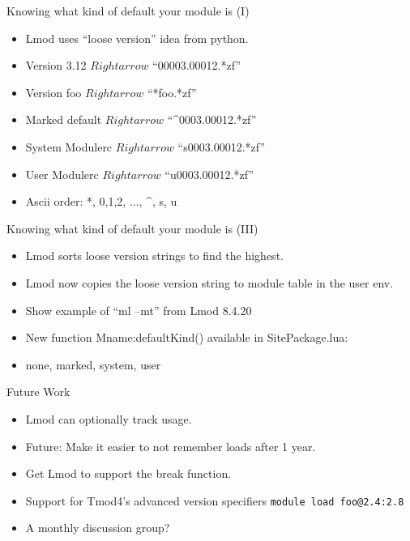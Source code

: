 \documentclass{beamer}
\begin{document}
\begin{frame}{Knowing what kind of default your module is (I)}
  \begin{itemize}
    \item Lmod uses ``loose version'' idea from python.
    \item Version 3.12 $Rightarrow$ ``00003.00012.*zf''
    \item Version foo $Rightarrow$ ``*foo.*zf''
    \item Marked default $Rightarrow$ ``\^{}0003.00012.*zf''
    \item System Modulerc $Rightarrow$ ``s0003.00012.*zf''
    \item User Modulerc $Rightarrow$ ``u0003.00012.*zf''
    \item Ascii order: *, 0,1,2, ..., \^{}, s, u
  \end{itemize}
\end{frame}

\begin{frame}{Knowing what kind of default your module is (III)}
  \begin{itemize}
    \item Lmod sorts loose version strings to find the highest.
    \item Lmod now copies the loose version string to module table in the
      user env.
    \item Show example of ``ml --mt'' from Lmod 8.4.20
    \item New function Mname:defaultKind() available in SitePackage.lua:
    \item  none, marked, system, user
  \end{itemize}
\end{frame}

\begin{frame}{Future Work}
  \begin{itemize}
    \item Lmod can optionally track usage.
    \item Future: Make it easier to not remember loads after 1 year.
    \item Get Lmod to support the break function.
    \item Support for Tmod4's advanced version specifiers
      \texttt{module load foo@2.4:2.8}
    \item A monthly discussion group?
  \end{itemize}
\end{frame}
\end{document}
